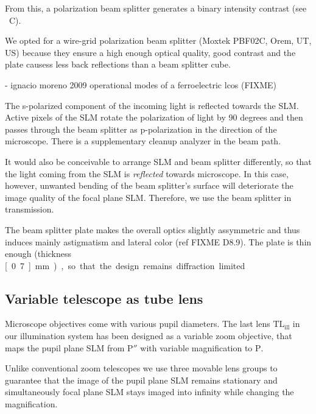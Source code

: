 From this, a polarization beam splitter generates a binary intensity
contrast (see ~C). 

We opted for a wire-grid polarization beam splitter (Moxtek PBF02C,
Orem, UT, US) because they ensure a high enough optical quality, good
contrast and the plate causess less back reflections than a beam
splitter cube.


- ignacio moreno 2009 operational modes of a ferroelectric lcos
(FIXME)

The s-polarized component of the incoming light is reflected towards
the SLM. Active pixels of the SLM rotate the polarization of light by
90 degrees and then passes through the beam splitter as p-polarization
in the direction of the microscope. There is a supplementary cleanup
analyzer in the beam path. 

It would also be conceivable to arrange SLM and beam splitter
differently, so that the light coming from the SLM is \emph{reflected}
towards microscope. In this case, however, unwanted bending of the
beam splitter's surface will deteriorate the image quality of the
focal plane SLM. Therefore, we use the beam splitter in transmission.


The beam splitter plate makes the overall optics slightly assymmetric
and thus induces mainly astigmatism and lateral color (ref FIXME
D8.9). The plate is thin enough (thickness \unit[0.7]{mm}), so that
the design remains diffraction limited.

 	
	  	


\subsection{ Variable telescope as tube lens}
Microscope objectives come with various pupil diameters. The last lens
$\textrm{TL}_\textrm{ill}$ in our illumination system has been
designed as a variable zoom objective, that maps the pupil plane SLM
from $\textrm{P}''$ with variable magnification to $\textrm{P}$.

Unlike conventional zoom telescopes we use three movable lens groups
to guarantee that the image of the pupil plane SLM remains stationary
and simultaneously focal plane SLM stays imaged into infinity while
changing the magnification.

